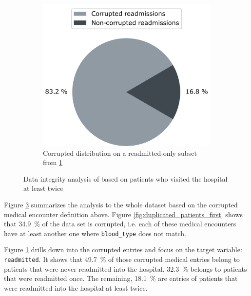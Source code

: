 \documentclass[a4paper,11pt]{article}
\newcommand{\bloodType}{\texttt{blood\_type}\xspace}
\newcommand{\readmitted}{\texttt{readmitted}\xspace}
\begin{document}
\begin{figure}[htb]
\begin{subfigure}{0.32\textwidth}
    \label{fig:duplicated_patients_second}
\end{subfigure}
\hfill
\begin{subfigure}{0.32\textwidth}
    \includegraphics[width=\textwidth]{images/pie_3.pdf}
    \caption{Corrupted distribution on a readmitted-only subset from \ref{fig:duplicated_patients_second}}
    \label{fig:duplicated_patients_third}
\end{subfigure}
        
\caption{Data integrity analysis of based on patients who visited the hospital at least twice}
\label{fig:duplicated_patients}
\end{figure}

Figure \ref{fig:duplicated_patients} summarizes the analysis to the whole dataset based on the corrupted medical encounter definition above. Figure \ref{fig:duplicated_patients_first} shows that \SI{34.9}{\percent} of the data set is corrupted, i.e. each of these medical encounters have at least another one where \bloodType does not match.

Figure \ref{fig:duplicated_patients_second} drills down into the corrupted entries and focus on the target variable: \readmitted. It shows that \SI{49.7}{\percent} of those corrupted medical entries belong to patients that were never readmitted into the hospital. \SI{32.3}{\percent} belongs to patients that were readmitted once. The remaining, \SI{18.1}{\percent} are entries of patients that were readmitted into the hospital at least twice.
\end{document}
